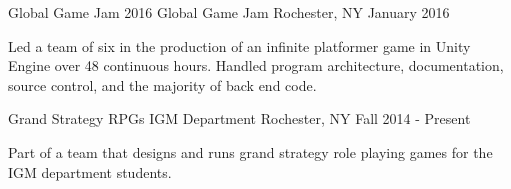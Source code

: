 \begin{cventries}

\cventry
{Global Game Jam 2016} %
{Global Game Jam} %
{Rochester, NY} %
{January 2016} %
{ %
\begin{cvitems}
\item {Led a team of six in the production of an infinite platformer game in Unity Engine over 48 continuous hours. Handled program architecture, documentation, source control, and the majority of back end code.}
\end{cvitems}
}

\cventry
{Grand Strategy RPGs} %
{IGM Department} %
{Rochester, NY} %
{Fall 2014 - Present} %
{ %
\begin{cvitems}
\item {Part of a team that designs and runs grand strategy role playing games for the IGM department students.}
\end{cvitems}
}



\end{cventries}